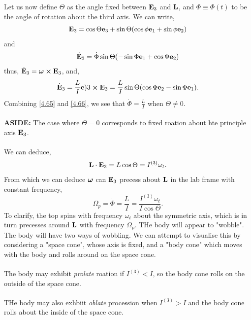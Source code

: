 \documentclass{book}
\begin{document}
Let us now define $\Theta$ as the angle fixed between $\vb{E}_3$ and $\vb{L}$, and $\Phi \equiv \Phi(t)$ to be the angle of rotation about the third axis. We can write,
\begin{equation}
	\vb{E}_3 = \cos\Theta\vb{e}_3 + \sin\Theta(\cos\phi\vb{e}_1 + \sin\phi\vb{e}_2)
\end{equation}
and
\begin{equation}
	\Dot{\vb{E}}_3 = \Dot{\Phi}\sin\Theta(-\sin\Phi\vb{e}_1 + \cos\Phi\vb{e}_2) \label{4.65}
\end{equation}
thus, $\Dot{\vb{E}}_3 = \vb*{\omega}\cross\vb{E}_3$, and,
\begin{equation}
	\Dot{\vb{E}}_3 = \frac{L}{I}\vb{e})3 \cross\vb{E}_3 = \frac{L}{I}\sin\Theta(\cos\Phi \vb{e}_2 - \sin\Phi \vb{e}_1) \label{4.66}.
\end{equation}
Combining \eqref{4.65} and \eqref{4.66}, we see that $\Dot{\Phi} = \frac{L}{I}$ when $\Theta \neq 0$.
\\\\
\textbf{ASIDE:} The case where $\Theta = 0$ corresponds to fixed roation about hte principle axis $\vb{E}_3$.
\\\\
We can deduce,
\begin{equation}
	\vb{L}\cdot\vb{E}_3 = L \cos\Theta = I^{(3)}\omega_t.
\end{equation}
From which we can deduce $\vb*{\omega}$ can $\vb{E}_3$ precess about $\vb{L}$ in the lab frame with constant frequency,
\begin{equation}
	\Omega_p = \Dot{\Phi} = \frac{L}{I} = \frac{I^{(3)}\omega_t}{I\cos\Theta}.
\end{equation}
To clarify, the top spins with frequency $\omega_t$ about the symmetric axis, which is in turn precesses around $\vb{L}$ with frequency $\Omega_p$. THe body will appear to "wobble". The body will have two ways of wobbling. We can attempt to visualise this by considering a "space cone", whose axis is fixed, and a "body cone" which moves with the body and rolls around on the space cone.
\\\\
The body may exhibit \textit{prolate} roation if $I^{(3)} < I$, so the body cone rolls on the outside of the space cone. 
\\\\
THe body may also exhbiit \textit{oblate} procession when $I^{(3)}>I$ and the body cone rolls about the inside of the space cone.
\end{document}
